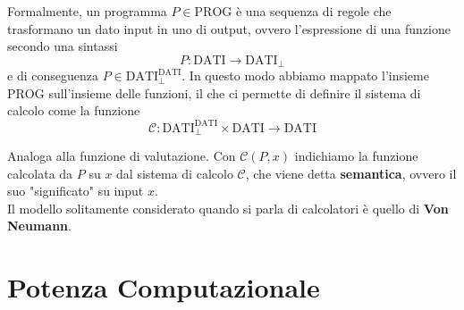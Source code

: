 Formalmente, un programma $P \in \text{PROG}$ è una sequenza di regole che trasformano un dato input in uno di output, ovvero l'espressione di una funzione secondo una sintassi 
$$ P: \text{DATI} \rightarrow \text{DATI}_\bot $$
e di conseguenza $P \in \text{DATI}^{\text{DATI}}_\bot$. In questo modo abbiamo mappato l'insieme $\text{PROG}$ sull'insieme delle funzioni, il che ci permette di definire il sistema di calcolo come la funzione
$$ \mathcal{C}: \text{DATI}^{\text{DATI}}_\bot \times \text{DATI} \rightarrow \text{DATI} $$

Analoga alla funzione di valutazione. Con $\mathcal{C}(P,x)$ indichiamo la funzione calcolata da $P$ su $x$ dal sistema di calcolo $\mathcal{C}$, che viene detta \textbf{semantica}, ovvero il suo "significato" su input $x$.\\

Il modello solitamente considerato quando si parla di calcolatori è quello di \textbf{Von Neumann}.\\

\section{Potenza Computazionale}












